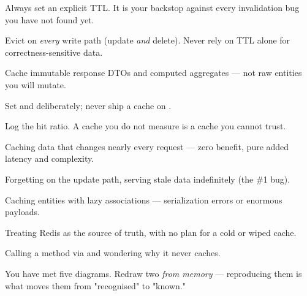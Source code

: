 \begin{bestpractices}
\begin{wbitem}
  \item Always set an explicit TTL. It is your backstop against every invalidation bug you have not found yet.
  \item Evict on \emph{every} write path (update \emph{and} delete). Never rely on TTL alone for correctness-sensitive data.
  \item Cache immutable response DTOs and computed aggregates --- not raw entities you will mutate.
  \item Set  and  deliberately; never ship a cache on .
  \item Log the hit ratio. A cache you do not measure is a cache you cannot trust.
\end{wbitem}
\end{bestpractices}
\begin{mistakes}
\begin{wbitem}
  \item Caching data that changes nearly every request --- zero benefit, pure added latency and complexity.
  \item Forgetting  on the update path, serving stale data indefinitely (the \#1 bug).
  \item Caching entities with lazy associations --- serialization errors or enormous payloads.
  \item Treating Redis as the source of truth, with no plan for a cold or wiped cache.
  \item Calling a  method via  and wondering why it never caches.
\end{wbitem}
\end{mistakes}


You have met five diagrams. Redraw two \emph{from memory} --- reproducing them is what moves them from "recognised" to "known."

\begin{writespace}
\end{writespace}

\begin{writespace}
\end{writespace}

